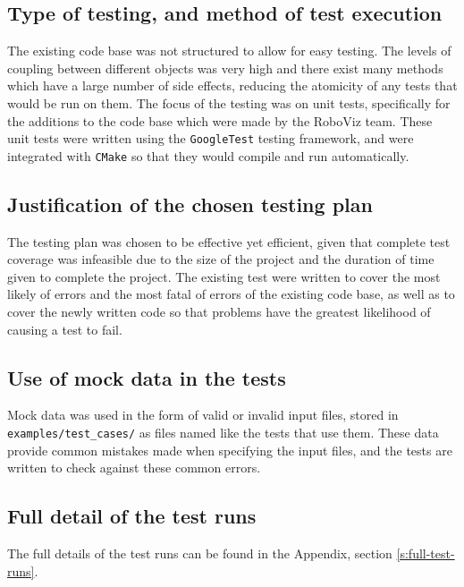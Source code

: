 \documentclass[11pt,a4paper]{article}
\begin{document}
\subsection{Type of testing, and method of test execution}
The existing code base was not structured to allow for easy testing. The levels
of coupling between different objects was very high and there exist many
methods which have a large number of side effects, reducing the atomicity of
any tests that would be run on them. The focus of the testing was on unit
tests, specifically for the additions to the code base which were made by the
RoboViz team. These unit tests were written using the \texttt{GoogleTest} testing
framework, and were integrated with \texttt{CMake} so that they would compile
and run automatically.

\subsection{Justification of the chosen testing plan}
The testing plan was chosen to be effective yet efficient, given that complete
test coverage was infeasible due to the size of the project and the duration of
time given to complete the project. The existing test were written to cover the
most likely of errors and the most fatal of errors of the existing code base,
as well as to cover the newly written code so that problems have the greatest
likelihood of causing a test to fail.

\subsection{Use of mock data in the tests}
Mock data was used in the form of valid or invalid input files, stored in
\texttt{examples/test\_cases/} as files named like the tests that use them.
These data provide common mistakes made when specifying the input files, and
the tests are written to check against these common errors.

\subsection{Full detail of the test runs}
The full details of the test runs can be found in the Appendix, section
\ref{s:full-test-runs}.
\end{document}
